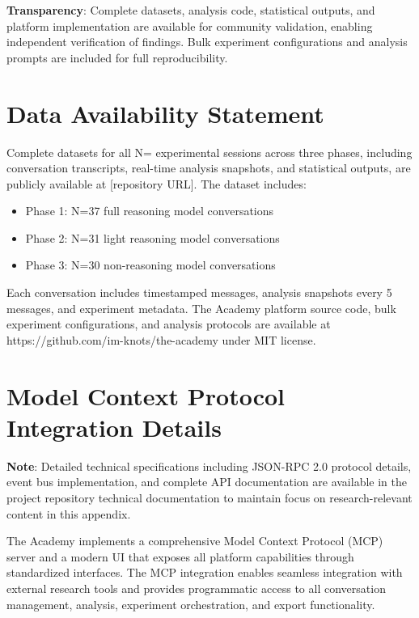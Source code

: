 \documentclass[11pt,letterpaper]{article}
\newcommand{\theacademy}{The Academy}
\newcommand{\exponedataTotalSessionsRaw}{37}
\newcommand{\exponedataTotalSessions}{N=\exponedataTotalSessionsRaw}
\newcommand{\exptwoTotalSessionsRaw}{31}
\newcommand{\exptwoTotalSessions}{N=\exptwoTotalSessionsRaw}
\newcommand{\expthreeTotalSessionsRaw}{30}
\newcommand{\expthreeTotalSessions}{N=\expthreeTotalSessionsRaw}
\newcommand{\totalAllPhasesRaw}{\fpeval{\exponedataTotalSessionsRaw + \exptwoTotalSessionsRaw + \expthreeTotalSessionsRaw}}
\newcommand{\totalAllPhases}{N=\totalAllPhasesRaw}
\begin{document}
\textbf{Transparency}: Complete datasets, analysis code, statistical outputs, and platform implementation are available for community validation, enabling independent verification of findings. Bulk experiment configurations and analysis prompts are included for full reproducibility.

\section*{Data Availability Statement}

Complete datasets for all \totalAllPhases{} experimental sessions across three phases, including conversation transcripts, real-time analysis snapshots, and statistical outputs, are publicly available at [repository URL]. The dataset includes:

\begin{itemize}
    \item Phase 1: \exponedataTotalSessions{} full reasoning model conversations
    \item Phase 2: \exptwoTotalSessions{} light reasoning model conversations  
    \item Phase 3: \expthreeTotalSessions{} non-reasoning model conversations
\end{itemize}

Each conversation includes timestamped messages, analysis snapshots every 5 messages, and experiment metadata. \theacademy{} platform source code, bulk experiment configurations, and analysis protocols are available at https://github.com/im-knots/the-academy under MIT license.



\appendix

\section{Model Context Protocol Integration Details}
\label{app:mcp}

\textbf{Note}: Detailed technical specifications including JSON-RPC 2.0 protocol details, event bus implementation, and complete API documentation are available in the project repository technical documentation to maintain focus on research-relevant content in this appendix.

\theacademy{} implements a comprehensive Model Context Protocol (MCP) server and a modern UI that exposes all platform capabilities through standardized interfaces. The MCP integration enables seamless integration with external research tools and provides programmatic access to all conversation management, analysis, experiment orchestration, and export functionality.
\end{document}
